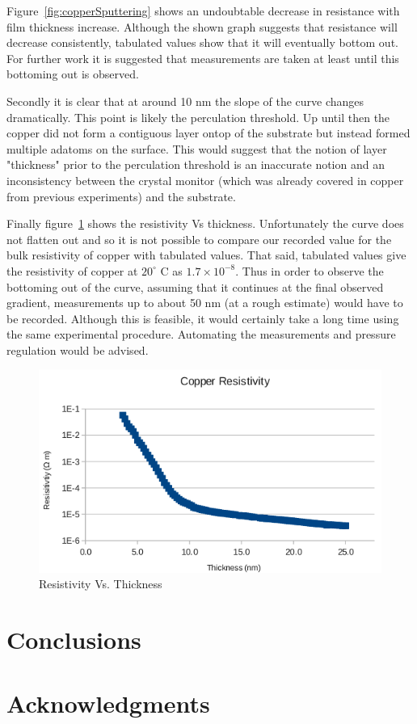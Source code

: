 \documentclass[aps,prl,twocolumn,groupedaddress,showkeys]{revtex4}
\begin{document}
Figure~\ref{fig:copperSputtering} shows an undoubtable decrease in resistance with film thickness increase. Although the shown graph suggests that resistance will decrease consistently, tabulated values show that it will eventually bottom out. For further work it is suggested that measurements are taken at least until this bottoming out is observed.

Secondly it is clear that at around 10 nm the slope of the curve changes dramatically. This point is likely the perculation threshold. Up until then the copper did not form a contiguous layer ontop of the substrate but instead formed multiple adatoms on the surface. This would suggest that the notion of layer "thickness" prior to the perculation threshold is an inaccurate notion and an inconsistency between the crystal monitor (which was already covered in copper from previous experiments) and the substrate.

Finally figure~\ref{fig:copperResistivity} shows the resistivity Vs thickness. Unfortunately the curve does not flatten out and so it is not possible to compare our recorded value for the bulk resistivity of copper with tabulated values. That said, tabulated values give the resistivity of copper at $20^{\circ}$ C as $1.7\times10^{-8}$. Thus in order to observe the bottoming out of the curve, assuming that it continues at the final observed gradient, measurements up to about 50 nm (at a rough estimate) would have to be recorded. Although this is feasible, it would certainly take a long time using the same experimental procedure. Automating the measurements and pressure regulation would be advised.

\begin{figure}[h]
	\includegraphics[width=\linewidth]{copperResistivity.png}
	\caption{Resistivity Vs. Thickness}
	\label{fig:copperResistivity}
\end{figure}

\section{Conclusions}

\section{Acknowledgments}
\end{document}
